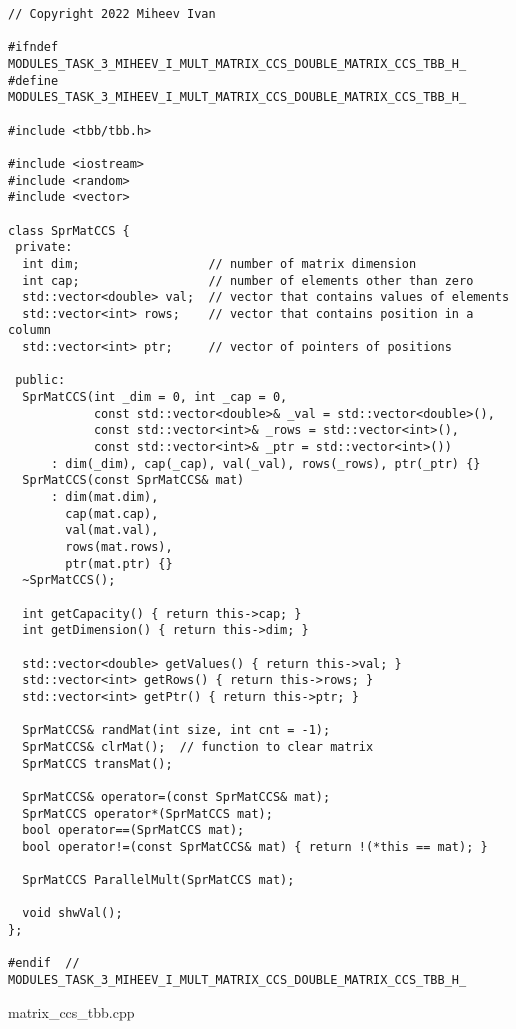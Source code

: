 \documentclass{report}
\begin{document}
\begin{lstlisting}
// Copyright 2022 Miheev Ivan

#ifndef MODULES_TASK_3_MIHEEV_I_MULT_MATRIX_CCS_DOUBLE_MATRIX_CCS_TBB_H_
#define MODULES_TASK_3_MIHEEV_I_MULT_MATRIX_CCS_DOUBLE_MATRIX_CCS_TBB_H_

#include <tbb/tbb.h>

#include <iostream>
#include <random>
#include <vector>

class SprMatCCS {
 private:
  int dim;                  // number of matrix dimension
  int cap;                  // number of elements other than zero
  std::vector<double> val;  // vector that contains values of elements
  std::vector<int> rows;    // vector that contains position in a column
  std::vector<int> ptr;     // vector of pointers of positions

 public:
  SprMatCCS(int _dim = 0, int _cap = 0,
            const std::vector<double>& _val = std::vector<double>(),
            const std::vector<int>& _rows = std::vector<int>(),
            const std::vector<int>& _ptr = std::vector<int>())
      : dim(_dim), cap(_cap), val(_val), rows(_rows), ptr(_ptr) {}
  SprMatCCS(const SprMatCCS& mat)
      : dim(mat.dim),
        cap(mat.cap),
        val(mat.val),
        rows(mat.rows),
        ptr(mat.ptr) {}
  ~SprMatCCS();

  int getCapacity() { return this->cap; }
  int getDimension() { return this->dim; }

  std::vector<double> getValues() { return this->val; }
  std::vector<int> getRows() { return this->rows; }
  std::vector<int> getPtr() { return this->ptr; }

  SprMatCCS& randMat(int size, int cnt = -1);
  SprMatCCS& clrMat();  // function to clear matrix
  SprMatCCS transMat();

  SprMatCCS& operator=(const SprMatCCS& mat);
  SprMatCCS operator*(SprMatCCS mat);
  bool operator==(SprMatCCS mat);
  bool operator!=(const SprMatCCS& mat) { return !(*this == mat); }

  SprMatCCS ParallelMult(SprMatCCS mat);

  void shwVal();
};

#endif  // MODULES_TASK_3_MIHEEV_I_MULT_MATRIX_CCS_DOUBLE_MATRIX_CCS_TBB_H_
\end{lstlisting}

matrix\_ccs\_tbb.cpp
\end{document}
